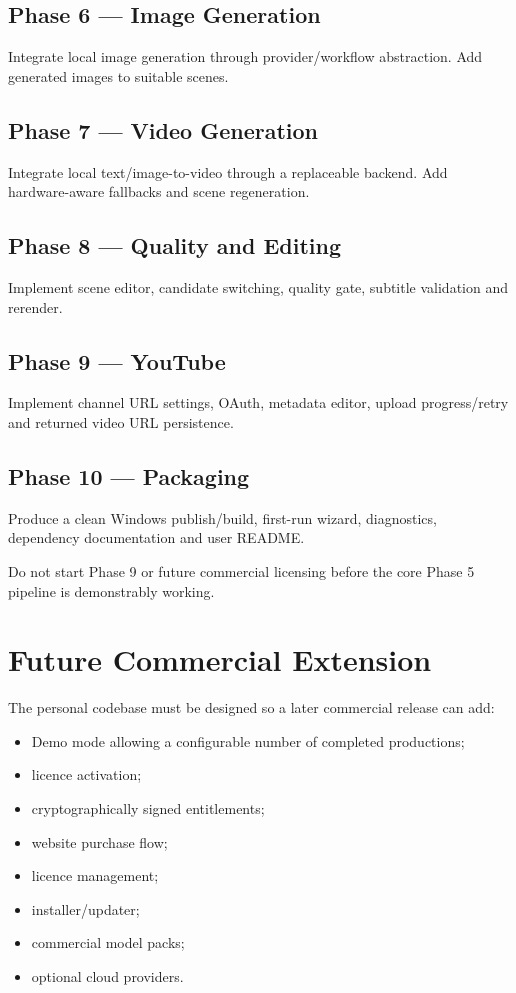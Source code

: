 \documentclass[10pt,journal,compsoc]{IEEEtran}
\begin{document}
\subsection{Phase 6 --- Image Generation}
Integrate local image generation through provider/workflow abstraction. Add generated images to suitable scenes.

\subsection{Phase 7 --- Video Generation}
Integrate local text/image-to-video through a replaceable backend. Add hardware-aware fallbacks and scene regeneration.

\subsection{Phase 8 --- Quality and Editing}
Implement scene editor, candidate switching, quality gate, subtitle validation and rerender.

\subsection{Phase 9 --- YouTube}
Implement channel URL settings, OAuth, metadata editor, upload progress/retry and returned video URL persistence.

\subsection{Phase 10 --- Packaging}
Produce a clean Windows publish/build, first-run wizard, diagnostics, dependency documentation and user README.

Do not start Phase 9 or future commercial licensing before the core Phase 5 pipeline is demonstrably working.

\section{Future Commercial Extension}

The personal codebase must be designed so a later commercial release can add:
\begin{itemize}
    \item Demo mode allowing a configurable number of completed productions;
    \item licence activation;
    \item cryptographically signed entitlements;
    \item website purchase flow;
    \item licence management;
    \item installer/updater;
    \item commercial model packs;
    \item optional cloud providers.
\end{itemize}
\end{document}
